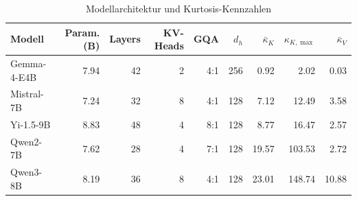 \begin{table}[htbp]
\centering
\caption{Modellarchitektur und Kurtosis-Kennzahlen}
\label{tab:model_metrics}
\begin{tabular}{|p{2.2cm}|r|r|r|r|r|r|r|r|}
\toprule
\textbf{Modell} & \textbf{Param. (B)} & \textbf{Layers} & \textbf{KV-Heads} & \textbf{GQA} & \textbf{$d_h$} & \textbf{$\bar{\kappa}_K$} & \textbf{$\kappa_{K,\max}$} & \textbf{$\bar{\kappa}_V$} \\
\midrule
Gemma-4-E4B & 7.94 & 42 & 2 & 4:1 & 256 & 0.92 & 2.02 & 0.03 \\
Mistral-7B & 7.24 & 32 & 8 & 4:1 & 128 & 7.12 & 12.49 & 3.58 \\
Yi-1.5-9B & 8.83 & 48 & 4 & 8:1 & 128 & 8.77 & 16.47 & 2.57 \\
Qwen2-7B & 7.62 & 28 & 4 & 7:1 & 128 & 19.57 & 103.53 & 2.72 \\
Qwen3-8B & 8.19 & 36 & 8 & 4:1 & 128 & 23.01 & 148.74 & 10.88 \\
\bottomrule
\end{tabular}
\end{table}